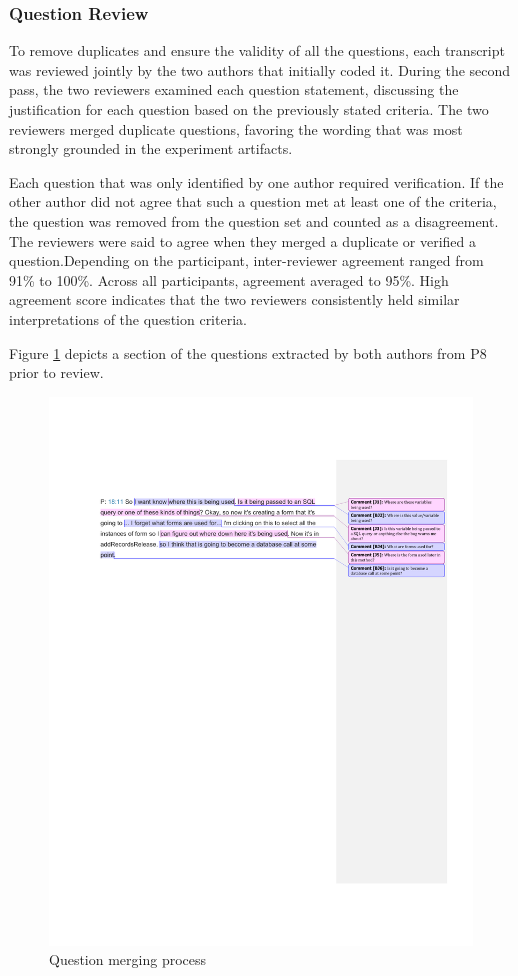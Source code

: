 \documentclass[conference]{IEEEtran}
\begin{document}
\subsubsection{Question Review}
To remove duplicates and ensure the validity of all the questions, each transcript was reviewed jointly by the two authors that initially coded it.
During the second pass, the two reviewers examined each question statement, discussing the justification for each question based on the previously stated criteria.
The two reviewers merged duplicate questions, favoring the wording that was most strongly grounded in the experiment artifacts.

Each question that was only identified by one author required verification.
If the other author did not agree that such a question met at least one of the criteria, the question was removed from the question set and counted as a disagreement.
The reviewers were said to agree when they merged a duplicate or verified a question.Depending on the participant, inter-reviewer agreement ranged from 91\% to 100\%. Across all participants, agreement averaged to 95\%.
High agreement score indicates that the two reviewers consistently held similar interpretations of the question criteria.


Figure \ref{fig:merging} depicts a section of the questions extracted by both authors from P8 prior to review.

\begin{figure}
\centering
\includegraphics[width=7.5in]{Images/QuestionMerging}
\caption{Question merging process}
\label{fig:merging} 
\end{figure}
\end{document}
